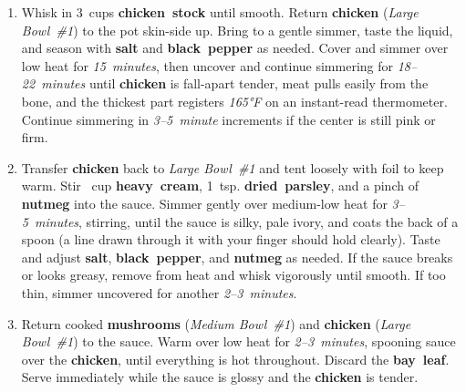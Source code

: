\documentclass[11pt,letterpaper]{article}
\begin{document}
\begin{enumerate}
    \item Whisk in 3~cups \textbf{chicken~stock} until smooth. Return \textbf{chicken} (\textit{Large Bowl~\#1}) to the pot skin-side up. Bring to a gentle simmer, taste the liquid, and season with \textbf{salt} and \textbf{black~pepper} as needed. Cover and simmer over low heat for \textit{15~minutes}, then uncover and continue simmering for \textit{18--22~minutes} until \textbf{chicken} is fall-apart tender, meat pulls easily from the bone, and the thickest part registers \textit{165°F} on an instant-read thermometer. Continue simmering in \textit{3--5~minute} increments if the center is still pink or firm.

    \item Transfer \textbf{chicken} back to \textit{Large Bowl~\#1} and tent loosely with foil to keep warm. Stir ~cup \textbf{heavy~cream}, 1~tsp. \textbf{dried~parsley}, and a pinch of \textbf{nutmeg} into the sauce. Simmer gently over medium-low heat for \textit{3--5~minutes}, stirring, until the sauce is silky, pale ivory, and coats the back of a spoon (a line drawn through it with your finger should hold clearly). Taste and adjust \textbf{salt}, \textbf{black~pepper}, and \textbf{nutmeg} as needed. If the sauce breaks or looks greasy, remove from heat and whisk vigorously until smooth. If too thin, simmer uncovered for another \textit{2--3~minutes}.

    \item Return cooked \textbf{mushrooms} (\textit{Medium Bowl~\#1}) and \textbf{chicken} (\textit{Large Bowl~\#1}) to the sauce. Warm over low heat for \textit{2--3~minutes}, spooning sauce over the \textbf{chicken}, until everything is hot throughout. Discard the \textbf{bay~leaf}. Serve immediately while the sauce is glossy and the \textbf{chicken} is tender.
\end{enumerate}

\newpage
\end{document}
